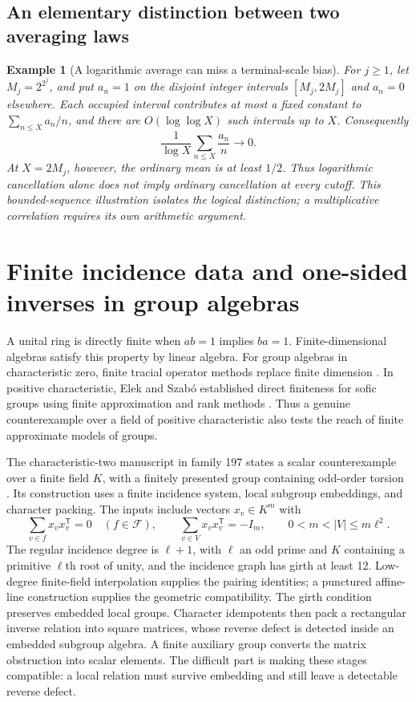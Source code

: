 \documentclass[11pt]{article}
\newtheorem{example}{Example}[section]
\begin{document}
\subsection{An elementary distinction between two averaging laws}
\begin{example}[A logarithmic average can miss a terminal-scale bias]
For $j\ge1$, let $M_j=2^{2^j}$, and put $a_n=1$ on the disjoint integer intervals
$[M_j,2M_j]$ and $a_n=0$ elsewhere. Each occupied interval contributes at
most a fixed constant to $\sum_{n\le X}a_n/n$, and there are
$O(\log\log X)$ such intervals up to $X$. Consequently
\[
 \frac{1}{\log X}\sum_{n\le X}\frac{a_n}{n}\longrightarrow0.
\]
At $X=2M_j$, however, the ordinary mean is at least $1/2$. Thus
logarithmic cancellation alone does not imply ordinary cancellation at
every cutoff. This bounded-sequence illustration isolates the logical
distinction; a multiplicative correlation requires its own arithmetic
argument.
\end{example}



\section{Finite incidence data and one-sided inverses in group algebras}
\label{sec:algebra}
A unital ring is directly finite when $ab=1$ implies $ba=1$.
Finite-dimensional algebras satisfy this property by linear algebra.
For group algebras in characteristic zero, finite tracial operator methods
replace finite dimension \citep{Montgomery1969}. In positive characteristic,
Elek and Szab\'o established direct finiteness for sofic groups using finite
approximation and rank methods \citep{ElekSzabo2004}. Thus a genuine
counterexample over a field of positive characteristic also tests the
reach of finite approximate models of groups.

The characteristic-two manuscript in family 197 states a scalar
counterexample over a finite field $K$, with a finitely presented group
containing odd-order torsion \citep{OAIDirectFinite}. Its construction
uses a finite incidence system, local subgroup embeddings, and character
packing. The inputs include vectors $x_v\in K^m$ with
\begin{equation}\label{eq:incidence}
 \sum_{v\in f}x_vx_v^{\mathsf T}=0\quad(f\in\mathcal F),\qquad
 \sum_{v\in V}x_vx_v^{\mathsf T}=-I_m,\qquad
 0<m<|V|\le m\ell^2.
\end{equation}
The regular incidence degree is $\ell+1$, with $\ell$ an odd prime and
$K$ containing a primitive $\ell$th root of unity,
and the incidence graph has girth at least 12. Low-degree finite-field
interpolation supplies the pairing identities; a punctured affine-line
construction supplies the geometric compatibility. The girth condition
preserves embedded local groups. Character idempotents then pack a
rectangular inverse relation into square matrices, whose reverse defect
is detected inside an embedded subgroup algebra. A finite auxiliary
group converts the matrix obstruction into scalar elements. The difficult part is making these stages compatible: a local relation
must survive embedding and still leave a detectable reverse defect.
\end{document}
